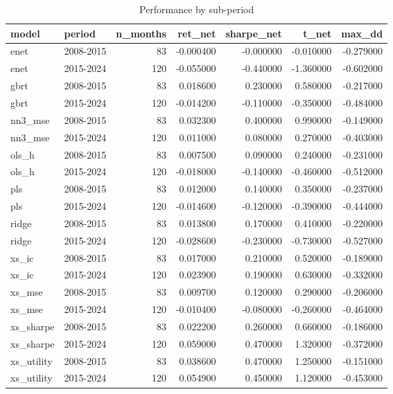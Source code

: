 \begin{table}
\caption{Performance by sub-period}
\label{tab:t6_subperiods}
\begin{tabular}{llrrrrr}
\toprule
model & period & n\_months & ret\_net & sharpe\_net & t\_net & max\_dd \\
\midrule
enet & 2008-2015 & 83 & -0.000400 & -0.000000 & -0.010000 & -0.279000 \\
enet & 2015-2024 & 120 & -0.055000 & -0.440000 & -1.360000 & -0.602000 \\
gbrt & 2008-2015 & 83 & 0.018600 & 0.230000 & 0.580000 & -0.217000 \\
gbrt & 2015-2024 & 120 & -0.014200 & -0.110000 & -0.350000 & -0.484000 \\
nn3\_mse & 2008-2015 & 83 & 0.032300 & 0.400000 & 0.990000 & -0.149000 \\
nn3\_mse & 2015-2024 & 120 & 0.011000 & 0.080000 & 0.270000 & -0.403000 \\
ols\_h & 2008-2015 & 83 & 0.007500 & 0.090000 & 0.240000 & -0.231000 \\
ols\_h & 2015-2024 & 120 & -0.018000 & -0.140000 & -0.460000 & -0.512000 \\
pls & 2008-2015 & 83 & 0.012000 & 0.140000 & 0.350000 & -0.237000 \\
pls & 2015-2024 & 120 & -0.014600 & -0.120000 & -0.390000 & -0.444000 \\
ridge & 2008-2015 & 83 & 0.013800 & 0.170000 & 0.410000 & -0.220000 \\
ridge & 2015-2024 & 120 & -0.028600 & -0.230000 & -0.730000 & -0.527000 \\
xs\_ic & 2008-2015 & 83 & 0.017000 & 0.210000 & 0.520000 & -0.189000 \\
xs\_ic & 2015-2024 & 120 & 0.023900 & 0.190000 & 0.630000 & -0.332000 \\
xs\_mse & 2008-2015 & 83 & 0.009700 & 0.120000 & 0.290000 & -0.206000 \\
xs\_mse & 2015-2024 & 120 & -0.010400 & -0.080000 & -0.260000 & -0.464000 \\
xs\_sharpe & 2008-2015 & 83 & 0.022200 & 0.260000 & 0.660000 & -0.186000 \\
xs\_sharpe & 2015-2024 & 120 & 0.059000 & 0.470000 & 1.320000 & -0.372000 \\
xs\_utility & 2008-2015 & 83 & 0.038600 & 0.470000 & 1.250000 & -0.151000 \\
xs\_utility & 2015-2024 & 120 & 0.054900 & 0.450000 & 1.120000 & -0.453000 \\
\bottomrule
\end{tabular}
\end{table}
